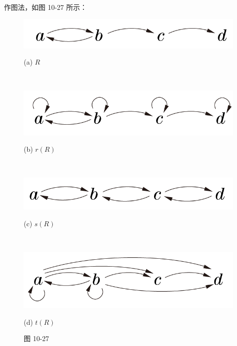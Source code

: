 \documentclass[UTF8]{ctexart}
\begin{document}
    作图法，如图 10-27 所示：
    \begin{figure}[!htb]
        \centering
        \begin{minipage}[t]{0.453\textwidth}
        \centering
        \includegraphics[width=1\textwidth]{10-27-o.png}
        \caption*{(a) $R$}
        \end{minipage}
        \\
        \begin{minipage}[t]{0.454\textwidth}
        \centering
        \includegraphics[width=1\textwidth]{10-27-r.png}
        \caption*{(b) $r(R)$}
        \end{minipage}
        \\
        \begin{minipage}[t]{0.443\textwidth}
        \centering
        \includegraphics[width=1\textwidth]{10-27-s.png}
        \caption*{(c) $s(R)$}
        \end{minipage}
        \\
        \begin{minipage}[t]{0.458\textwidth}
        \centering
        \includegraphics[width=1\textwidth]{10-27-t.png}
        \caption*{(d) $t(R)$}
        \end{minipage}
        \caption*{图 10-27}
    \end{figure}
\end{document}

